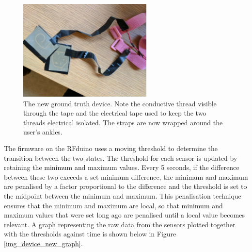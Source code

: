             \begin{figure}[!th]
                \includegraphics[width=0.6\textwidth]{Images/device_new.jpg}
                \centering
                \caption{The new ground truth device. Note the conductive thread visible through the tape and the electrical tape used to keep the two threads electrical isolated. The straps are now wrapped around the user's ankles.}
                \label{img_device_new}
            \end{figure}

            The firmware on the RFduino uses a moving threshold to determine the transition between the two states. The threshold for each sensor is updated by retaining the minimum and maximum values. Every 5 seconds, if the difference between these two exceeds a set minimum difference, the minimum and maximum are penalised by a factor proportional to the difference and the threshold is set to the midpoint between the minimum and maximum. This penalisation technique ensures that the minimum and maximum are local, so that minimum and maximum values that were set long ago are penalised until a local value becomes relevant. A graph representing the raw data from the sensors plotted together with the thresholds against time is shown below in Figure \ref{img_device_new_graph}.

